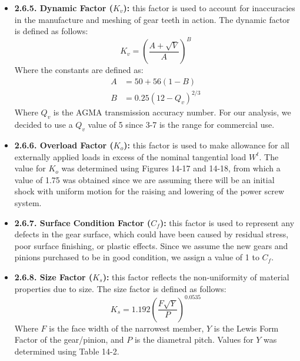 \documentclass[letterpaper,12pt]{article}
\begin{document}
\begin{itemize}[leftmargin=3mm]
    \item \textbf{2.6.5. Dynamic Factor ($K_v$):} this factor is used to account for inaccuracies in the manufacture and meshing of gear teeth in action. The dynamic factor is defined as follows:
    \begin{equation}
        K_v = \left(\dfrac{A + \sqrt{V}}{A}\right)^B
    \end{equation}
    Where the constants are defined as:
    \begin{align*}
        A &= 50 + 56(1-B) \\
        B &= 0.25(12-Q_v)^{2/3}
    \end{align*}
    Where $Q_v$ is the AGMA transmission accuracy number. For our analysis, we decided to use a $Q_v$ value of 5 since 3-7 is the range for commercial use.
    
    \item \textbf{2.6.6. Overload Factor ($K_o$):} this factor is used to make allowance for all externally applied loads in excess of the nominal tangential load $W^t$. The value for $K_o$ was determined using Figures 14-17 and 14-18, from which a value of 1.75 was obtained since we are assuming there will be an initial shock with uniform motion for the raising and lowering of the power screw system.
    
    \item \textbf{2.6.7. Surface Condition Factor ($C_f$):} this factor is used to represent any defects in the gear surface, which could have been caused by residual stress, poor surface finishing, or plastic effects. Since we assume the new gears and pinions purchased to be in good condition, we assign a value of 1 to $C_f$.
    
    \item \textbf{2.6.8. Size Factor ($K_s$):} this factor reflects the non-uniformity of material properties due to size. The size factor is defined as follows:
    \begin{equation}
        K_s = 1.192 \left(\dfrac{F \sqrt{Y}}{P}\right)^{0.0535}
    \end{equation}
    Where $F$ is the face width of the narrowest member, $Y$ is the Lewis Form Factor of the gear/pinion, and $P$ is the diametral pitch. Values for $Y$ was determined using Table 14-2.
    

\end{itemize}
\end{document}
